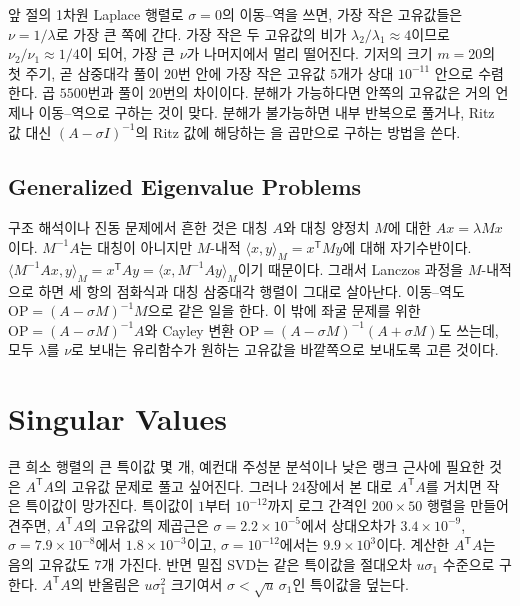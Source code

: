 앞 절의 1차원 Laplace 행렬로 $\sigma=0$의 이동--역을 쓰면, 가장 작은 고유값들은 $\nu=1/\lambda$로 가장 큰 쪽에 간다. 가장 작은 두 고유값의 비가 $\lambda_2/\lambda_1\approx4$이므로 $\nu_2/\nu_1\approx1/4$이 되어, 가장 큰 $\nu$가 나머지에서 멀리 떨어진다. 기저의 크기 $m=20$의 첫 주기, 곧 삼중대각 풀이 $20$번 안에 가장 작은 고유값 $5$개가 상대 $10^{-11}$ 안으로 수렴한다. 곱 $5500$번과 풀이 $20$번의 차이이다. 분해가 가능하다면 안쪽의 고유값은 거의 언제나 이동--역으로 구하는 것이 맞다. 분해가 불가능하면 내부 반복으로 풀거나, Ritz 값 대신 $(A-\sigma I)^{-1}$의 Ritz 값에 해당하는 을 곱만으로 구하는 방법을 쓴다\cite{morgan1991harmonic}.

\subsection{Generalized Eigenvalue Problems}

구조 해석이나 진동 문제에서 흔한 것은 대칭 $A$와 대칭 양정치 $M$에 대한  $Ax=\lambda Mx$이다. $M^{-1}A$는 대칭이 아니지만 $M$-내적 $\langle x,y\rangle_M=x^{\mathsf T}My$에 대해 자기수반이다. $\langle M^{-1}Ax,y\rangle_M=x^{\mathsf T}Ay=\langle x,M^{-1}Ay\rangle_M$이기 때문이다. 그래서 Lanczos 과정을 $M$-내적으로 하면 세 항의 점화식과 대칭 삼중대각 행렬이 그대로 살아난다. 이동--역도 $\mathrm{OP}=(A-\sigma M)^{-1}M$으로 같은 일을 한다. 이 밖에 좌굴 문제를 위한 $\mathrm{OP}=(A-\sigma M)^{-1}A$와 Cayley 변환 $\mathrm{OP}=(A-\sigma M)^{-1}(A+\sigma M)$도 쓰는데, 모두 $\lambda$를 $\nu$로 보내는 유리함수가 원하는 고유값을 바깥쪽으로 보내도록 고른 것이다\cite{lehoucq1998arpack}.

\section{Singular Values}
\label{sec:large-svd}

큰 희소 행렬의 큰 특이값 몇 개, 예컨대 주성분 분석이나 낮은 랭크 근사에 필요한 것은 $A^{\mathsf T}A$의 고유값 문제로 풀고 싶어진다. 그러나 24장에서 본 대로 $A^{\mathsf T}A$를 거치면 작은 특이값이 망가진다. 특이값이 $1$부터 $10^{-12}$까지 로그 간격인 $200\times50$ 행렬을 만들어 견주면, $A^{\mathsf T}A$의 고유값의 제곱근은 $\sigma=2.2\times10^{-5}$에서 상대오차가 $3.4\times10^{-9}$, $\sigma=7.9\times10^{-8}$에서 $1.8\times10^{-3}$이고, $\sigma=10^{-12}$에서는 $9.9\times10^3$이다. 계산한 $A^{\mathsf T}A$는 음의 고유값도 $7$개 가진다. 반면 밀집 SVD는 같은 특이값을 절대오차 $u\sigma_1$ 수준으로 구한다. $A^{\mathsf T}A$의 반올림은 $u\sigma_1^2$ 크기여서 $\sigma<\sqrt u\,\sigma_1$인 특이값을 덮는다.

